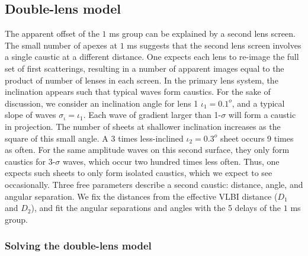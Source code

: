 \documentclass[useAMS,usenatbib]{mn2e}
\begin{document}
\subsection{Double-lens model}
\label{doublelensmodel}

The apparent offset of the $1$ ms group can be explained by a second lens
screen.  The small number of apexes at $1$ ms suggests that the second
lens screen involves a single caustic at a different distance.  One
expects each lens to re-image the full set of first scatterings,
resulting in a number of apparent images equal to the product of
number of lenses in each screen.
In the
primary lens system, the inclination appears such that typical waves
form caustics.  For the sake of discussion, we consider an inclination
angle for lens 1 $\iota_1 = 0.1^o$, and a typical slope of waves
$\sigma_\iota = \iota_1$.   Each wave of gradient larger than
1-$\sigma$ will form a caustic in projection. 
The number of sheets at shallower inclination
increases as the square of this small angle.  A 3 times less-inclined $\iota_2=0.3^o$
sheet occurs 9 times as often.  For the same amplitude waves on this
second surface, they only form
caustics for 3-$\sigma$ waves, which occur two hundred times less
often.  Thus, one expects such sheets to only form isolated caustics,
which we expect to see occasionally.  Three free parameters describe a
second caustic: distance, angle, and angular separation.  We fix the
distances from the effective VLBI distance ($D_1$ and $D_2$), and fit the angular
separations and angles with the 5 delays of the $1$ ms group.

\subsubsection{Solving the double-lens model}
\end{document}
